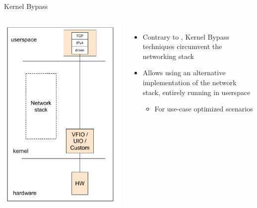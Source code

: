 \begin{frame}{Kernel Bypass}
	\begin{columns}
		\includegraphics[width=\textwidth]{slides/networking-stack-overview/kernel_bypass.pdf}
	\begin{itemize}
		\item Contrary to , Kernel Bypass techniques circumvent the networking stack
		\item Allows using an alternative implementation of the network stack, entirely running in userspace
			\begin{itemize}
				\item For use-case optimized scenarios
			\end{itemize}

\end{itemize}
\end{columns}
\end{frame}
